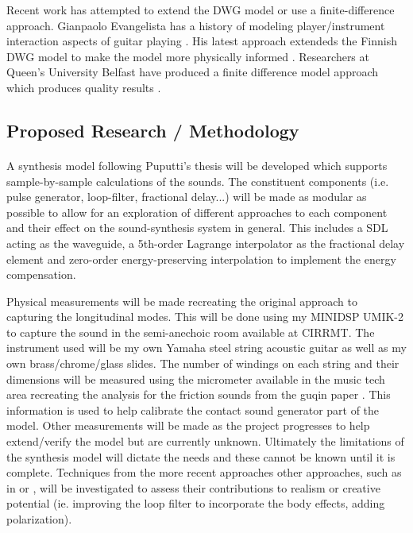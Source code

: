 \documentclass[12pt]{article}
\begin{document}
Recent work has attempted to extend the DWG model or use a finite-difference approach. Gianpaolo Evangelista has a history of modeling player/instrument interaction aspects of guitar playing \cite{evangelista_physical_2011} \cite{evangelista_playerinstrument_2010}. His latest approach extendeds the Finnish DWG model to make the model more physically informed \cite{evangelista_physical_2012}. Researchers at Queen’s University Belfast have produced a finite difference model approach which produces quality results \cite{bhanuprakash_finite_2020}.

\subsection*{Proposed Research / Methodology}
\paragraph{}
A synthesis model following Puputti's thesis will be developed which supports sample-by-sample calculations of the sounds. The constituent components (i.e. pulse generator, loop-filter, fractional delay...) will be made as modular as possible to allow for an exploration of different approaches to each component and their effect on the sound-synthesis system in general. This includes a SDL acting as the waveguide, a 5th-order Lagrange interpolator as the fractional delay element and zero-order energy-preserving interpolation to implement the energy compensation.

Physical measurements will be made recreating the original approach to capturing the longitudinal modes. This will be done using my MINIDSP UMIK-2 to capture the sound in the semi-anechoic room available at CIRRMT. The instrument used will be my own Yamaha steel string acoustic guitar as well as my own brass/chrome/glass slides. The number of windings on each string and their dimensions will be measured using the micrometer available in the music tech area recreating the analysis for the friction sounds from the guqin paper \cite{penttinen_model-based_2006}. This information is used to help calibrate the contact sound generator part of the model. Other measurements will be made as the project progresses to help extend/verify the model but are currently unknown. Ultimately the limitations of the synthesis model will dictate the needs and these cannot be known until it is complete. Techniques from the more recent approaches other approaches, such as in \cite{bhanuprakash_finite_2020} or \cite{evangelista_physical_2012}, will be investigated to assess their contributions to realism or creative potential (ie. improving the loop filter to incorporate the body effects, adding polarization). 
\end{document}
